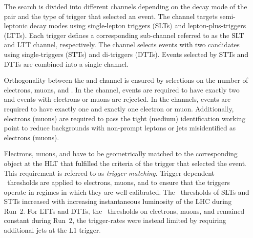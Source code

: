 The search is divided into different channels depending on the decay mode of the
\taulepton pair and the type of trigger that selected an event. The \lephad
channel targets semi-leptonic decay modes using single-lepton triggers (SLTs)
and lepton-plus-\tauhadvis triggers (LTTs). Each trigger defines a corresponding
sub-channel referred to as the \lephad SLT and \lephad LTT channel,
respectively. The \hadhad channel selects events with two \tauhadvis candidates
using single-\tauhadvis triggers (STTs) and di-\tauhadvis triggers (DTTs).
Events selected by STTs and DTTs are combined into a single channel.


Orthogonality between the \lephad and \hadhad channel is ensured by selections
on the number of electrons, muons, and \tauhadvis. In the \hadhad channel,
events are required to have exactly two \tauhadvis and events with electrons or
muons are rejected. In the \lephad channels, events are required to have exactly
one \tauhadvis and exactly one electron or muon. Additionally, electrons (muons)
are required to pass the tight (medium) identification working point to reduce
backgrounds with non-prompt leptons or jets misidentified as electrons (muons).

Electrons, muons, and \tauhadvis have to be geometrically matched to the
corresponding object at the HLT that fulfilled the criteria of the trigger that
selected the event.
This requirement is referred to as \emph{trigger-matching}. Trigger-dependent
\pT~thresholds are applied to electrons, muons, and \tauhadvis to ensure that
the triggers operate in regimes in which they are well-calibrated. The
\pT~thresholds of SLTs and STTs increased with increasing instantaneous
luminosity of the LHC during Run~2. For LTTs and DTTs, the \pT~thresholds on
electrons, muons, and \tauhadvis remained constant during Run~2, the
trigger-rates were instead limited by requiring additional jets at the L1
trigger.

